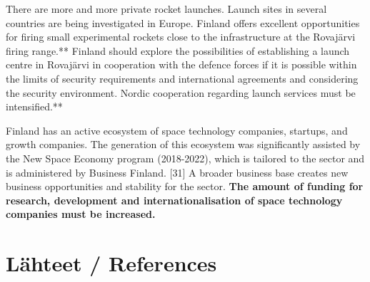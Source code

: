 \documentclass[nobib,finnish,oneside,openany,notoc,a4paper]{tufte-book}
\begin{document}
{There are more and more private rocket launches. Launch sites in several
countries are being investigated in Europe. Finland offers excellent
opportunities for firing small experimental rockets close to the
infrastructure at the Rovajärvi firing range.** Finland should explore
the possibilities of establishing a launch centre in Rovajärvi in
\hspace{0pt}\hspace{0pt}cooperation with the defence forces if it is
possible within the limits of security requirements and international
agreements and considering the security environment. Nordic cooperation
regarding launch services must be intensified.**

Finland has an active ecosystem of space technology companies, startups,
and growth companies. The generation of this ecosystem was significantly
assisted by the New Space Economy program (2018-2022), which is tailored
to the sector and is administered by Business Finland. {[}31{]} A
broader business base creates new business opportunities and stability
for the sector. \textbf{The amount of funding for research, development
and internationalisation of space technology companies must be
increased.}

\chapter{Lähteet / References}

}
\end{document}
